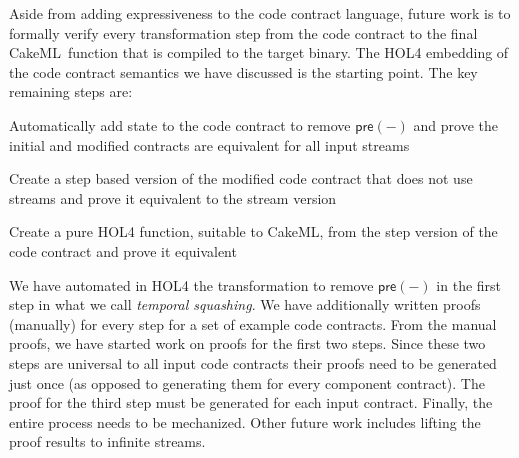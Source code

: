 \documentclass[global,twocolumn]{svjour}
\newcommand{\konst}[1]{\ensuremath{\mathsf{#1}}}
\newcommand{\ckml}{CakeML}
\begin{document}
Aside from adding expressiveness to the code contract language, future work is to formally verify every transformation step from the code contract to the final \ckml\ function that is compiled to the target binary.
%
The HOL4 embedding of the code contract semantics we have discussed is the starting point.  The key remaining steps are:
%
\begin{compactitem}
  \item Automatically add state to the code contract to remove $\konst{pre}(-)$ and prove the initial and modified contracts are equivalent for all input streams
  \item Create a step based version of the modified code contract that does not use streams and prove it equivalent to the stream version
  \item Create a pure HOL4 function, suitable to \ckml, from the step version of the code contract and prove it equivalent
\end{compactitem}
%
We have automated in HOL4 the transformation to remove $\konst{pre}(-)$ in the first step in what we call \emph{temporal squashing}.
%
We have additionally written proofs (manually) for every step for a set of example code contracts.
%
From the manual proofs, we have started work on proofs for the first two steps.
%
Since these two steps are universal to all input code contracts their proofs need to be generated just once (as opposed to generating them for every component contract).
%
The proof for the third step must be generated for each input contract.
%
Finally, the entire process needs to be mechanized.
%
Other future work includes lifting the proof results to infinite streams.

\clearpage


\end{document}
